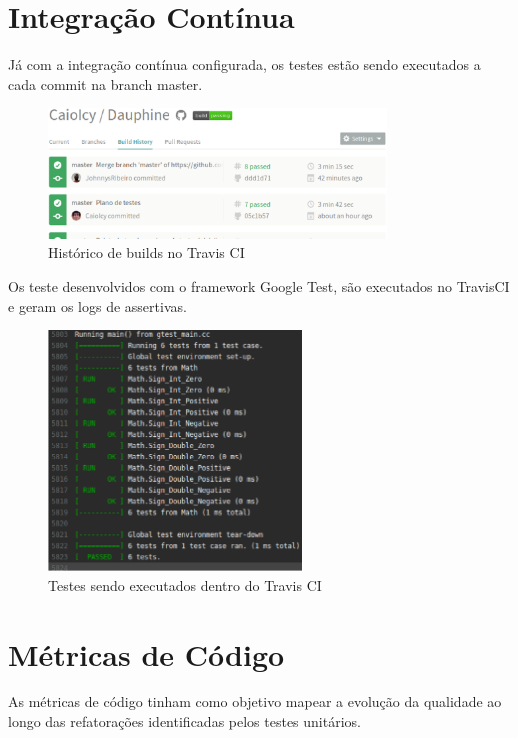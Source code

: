 \section {Integração Contínua}

Já com a integração contínua configurada, os testes estão sendo executados a cada commit na branch master.

\begin{figure}[h]
	\centering
	\includegraphics[width=0.8\textwidth]{figuras/vv_travis.eps}
	\caption{Histórico de builds no Travis CI}
	\label{img:travis}
\end{figure}

Os teste desenvolvidos com o framework Google Test, são executados no TravisCI e geram os logs de assertivas.

\newpage

\begin{figure}[h]
	\centering
	\includegraphics[width=0.6\textwidth]{figuras/vv_travis_tests.eps}
	\caption{Testes sendo executados dentro do Travis CI}
	\label{img:travis_tests}
\end{figure}

\section {Métricas de Código}

As métricas de código tinham como objetivo mapear a evolução da qualidade ao longo das refatorações identificadas pelos testes unitários.

